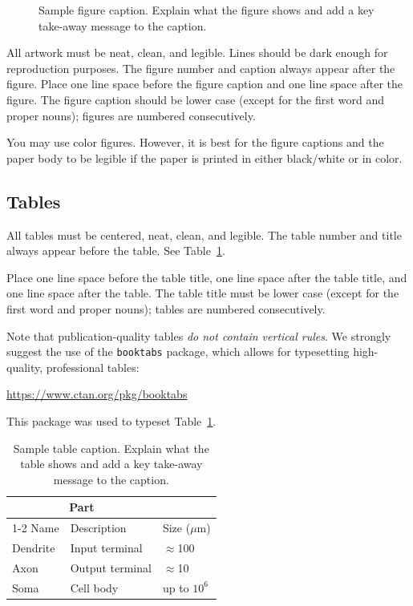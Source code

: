 \documentclass{article}
\begin{document}
\begin{figure}
  \centering
  \fbox{\rule[-.5cm]{0cm}{4cm} \rule[-.5cm]{4cm}{0cm}}
  \caption{Sample figure caption. Explain what the figure shows and add a key take-away message to the caption.}
\end{figure}


All artwork must be neat, clean, and legible. Lines should be dark enough for
 reproduction purposes. The figure number and caption always appear after the
figure. Place one line space before the figure caption and one line space after
the figure. The figure caption should be lower case (except for the first word and proper nouns); figures are numbered consecutively.


You may use color figures.  However, it is best for the figure captions and the
paper body to be legible if the paper is printed in either black/white or in
color.


\subsection{Tables}


All tables must be centered, neat, clean, and legible.  The table number and
title always appear before the table.  See Table~\ref{sample-table}.


Place one line space before the table title, one line space after the
table title, and one line space after the table. The table title must
be lower case (except for the first word and proper nouns); tables are
numbered consecutively.


Note that publication-quality tables \emph{do not contain vertical rules}. We
strongly suggest the use of the \verb+booktabs+ package, which allows for
typesetting high-quality, professional tables:
\begin{center}
  \url{https://www.ctan.org/pkg/booktabs}
\end{center}
This package was used to typeset Table~\ref{sample-table}.


\begin{table}
  \caption{Sample table caption. Explain what the table shows and add a key take-away message to the caption.}
  \label{sample-table}
  \centering
  \begin{tabular}{lll}
    \toprule
    \multicolumn{2}{c}{Part}                   \\
    \cmidrule(r){1-2}
    Name     & Description     & Size ($\mu$m) \\
    \midrule
    Dendrite & Input terminal  & $\approx$100     \\
    Axon     & Output terminal & $\approx$10      \\
    Soma     & Cell body       & up to $10^6$  \\
    \bottomrule
  \end{tabular}
\end{table}
\end{document}
